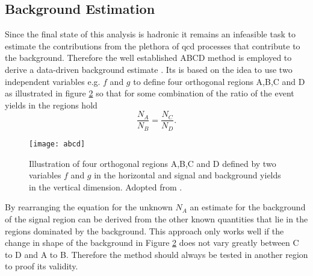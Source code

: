 \begin{figure}
    \centering
    \caption[]{}
    \label{fig:m_hh_plane}
\end{figure}

\subsection{Background Estimation}\label{sec:abcd}
Since the final state of this analysis is hadronic it remains an infeasible task to estimate the contributions from the plethora of \ac{qcd} processes that contribute to the background. Therefore the well established ABCD method is employed to derive a data-driven background estimate \citep{buttinger2018background,PhysRevD.103.035021}. Its is based on the idea to use two independent variables e.g. $f$ and $g$ to define four orthogonal regions A,B,C and D as illustrated in figure \ref{fig:abcd} so that for some combination of the ratio of the event yields in the regions hold
\begin{equation}
    \frac{N_A}{N_B}=\frac{N_C}{N_D}.
\end{equation}
\begin{figure}
    \centering
    \texttt{[image: abcd]}
    \caption[]{Illustration of four orthogonal regions A,B,C and D defined by two variables $f$ and $g$ in the horizontal and signal and background yields in the vertical dimension. Adopted from \citep{PhysRevD.103.035021}.}
    \label{fig:abcd}
\end{figure}
By rearranging the equation for the unknown $N_A$ an estimate for the background of the signal region can be derived from the other known quantities that lie in the regions dominated by the background. This approach only works well if the change in shape of the background in Figure \ref{fig:abcd} does not vary greatly between C to D and A to B. Therefore the method should always be tested in another region to proof its validity.

